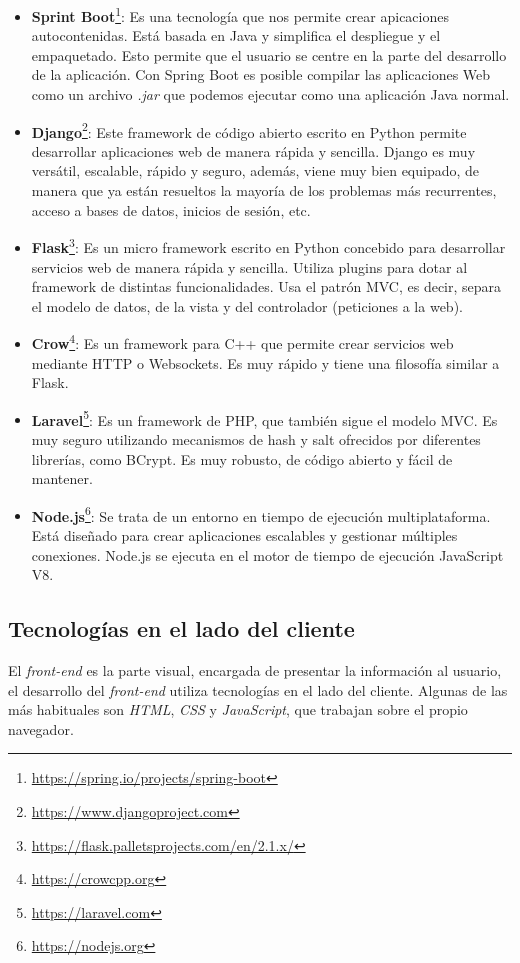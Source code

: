 \documentclass[a4paper, 12pt, oneside]{book}
\begin{document}
\begin{itemize}
\item \textbf{Sprint Boot}\footnote{\url{https://spring.io/projects/spring-boot}}: Es una tecnología que nos permite crear apicaciones autocontenidas. Está basada en Java y simplifica el despliegue y el empaquetado. Esto permite que el usuario se centre en la parte del desarrollo de la aplicación. Con Spring Boot es posible compilar las aplicaciones Web como un archivo \textit{.jar} que podemos ejecutar como una aplicación Java normal. 

\item \textbf{Django}\footnote{\url{https://www.djangoproject.com}}: Este framework de código abierto escrito en Python permite desarrollar aplicaciones web de manera rápida y sencilla. Django es muy versátil, escalable, rápido y seguro, además, viene muy bien equipado, de manera que ya están resueltos la mayoría de los problemas más recurrentes, acceso a bases de datos, inicios de sesión, etc. 

\item \textbf{Flask}\footnote{\url{https://flask.palletsprojects.com/en/2.1.x/}}: Es un micro framework escrito en Python concebido para desarrollar servicios web de manera rápida y sencilla. Utiliza plugins para dotar al framework de distintas funcionalidades. Usa el patrón MVC, es decir, separa el modelo de datos, de la vista y del controlador (peticiones a la web).  

\item \textbf{Crow}\footnote{\url{https://crowcpp.org}}: Es un framework para C++ que permite crear servicios web mediante HTTP o Websockets. Es muy rápido y tiene una filosofía similar a Flask. 

\item \textbf{Laravel}\footnote{\url{https://laravel.com}}: Es un framework de PHP, que también sigue el modelo MVC. Es muy seguro utilizando mecanismos de hash y salt ofrecidos por diferentes librerías, como BCrypt. Es muy robusto, de código abierto y fácil de mantener.  

\item \textbf{Node.js}\footnote{\url{https://nodejs.org}}: Se trata de un entorno en tiempo de ejecución multiplataforma. Está diseñado para crear aplicaciones escalables y gestionar múltiples conexiones. Node.js se ejecuta en el motor de tiempo de ejecución JavaScript V8.

\end{itemize}

\subsection{Tecnologías en el lado del cliente}
\label{subsec:tecnlogías en el lado del cliente}
El \textit{front-end} es la parte visual, encargada de presentar la información al usuario, el desarrollo del \textit{front-end} utiliza tecnologías en el lado del cliente. Algunas de las más habituales son \textit{HTML}, \textit{CSS} y \textit{JavaScript}, que trabajan sobre el propio navegador.
\end{document}
